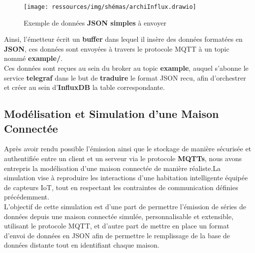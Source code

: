 \documentclass[10pt, a4paper]{report}
\begin{document}
	\begin{figure}[h!]
		\centering
		\texttt{[image: ressources/img/shémas/archiInflux.drawio]}
		\caption{Exemple de données \textbf{JSON simples} à envoyer}
		\label{fig:archiInflux}
	\end{figure}
	\vspace{1cm}
	Ainsi, l'émetteur écrit un \textbf{buffer} dans lequel il insère des données formatées en \textbf{JSON}, ces données sont envoyées à travers le protocole MQTT à un topic nommé \textbf{example/}.\\
	Ces données sont reçues au sein du broker au topic \textbf{example}, auquel s'abonne le service \textbf{telegraf} dans le but de \textbf{traduire} le format JSON recu, afin d'orchestrer et créer au sein d'\textbf{InfluxDB} la table correspondante.
	

	
	\subsection{Modélisation et Simulation d'une Maison Connectée}
	Après avoir rendu possible l'émission ainsi que le stockage de manière sécurisée et authentifiée entre un client et un serveur via le protocole \textbf{MQTTs}, nous avons entrepris la modélisation d'une maison connectée de manière réaliste.La simulation vise à reproduire les interactions d'une habitation intelligente équipée de capteurs IoT, tout en respectant les contraintes de communication définies précédemment.\\
	L'objectif de cette simulation est d'une part de permettre l'émission de séries de données depuis une maison connectée simulée, personnalisable et extensible, utilisant le protocole MQTT, et d'autre part de mettre en place un format d'envoi de données en JSON afin de permettre le remplissage de la base de données distante tout en identifiant chaque maison. 
\end{document}
